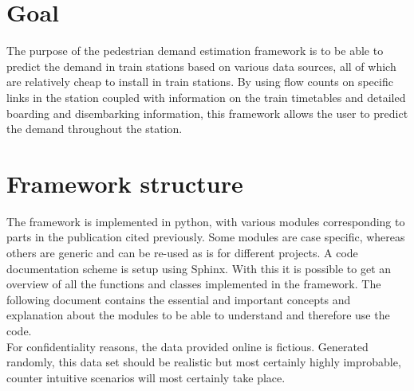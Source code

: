 \documentclass[a4paper,12pt]{article}
\begin{document}
\section{Goal}
The purpose of the pedestrian demand estimation framework is to be able to predict the demand in train stations based on various data sources, all of which are relatively cheap to install in train stations. By using flow counts on specific links in the station coupled with information on the train timetables and  detailed boarding and disembarking information, this framework allows the user to predict the demand throughout the station.\\
\section{Framework structure}
The framework is implemented in python, with various modules corresponding to parts in the publication cited previously. Some modules are case specific, whereas others are generic and can be re-used as is for different projects. A code documentation scheme is setup using Sphinx. With this it is possible to get an overview of all the functions and classes implemented in the framework. The following document contains the essential and important concepts and explanation about the modules to be able to understand and therefore use the code.\\
For confidentiality reasons, the data provided online is fictious. Generated randomly, this data set should be realistic but most certainly highly improbable, counter intuitive scenarios will most certainly take place.
\end{document}
